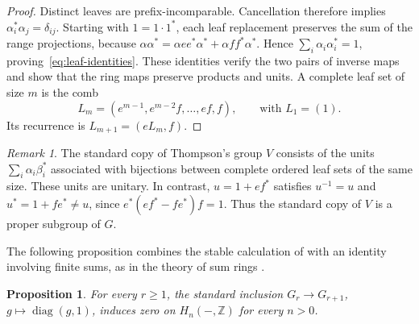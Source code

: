 \documentclass[11pt]{amsart}
\newcommand{\Z}{\mathbb Z}
\newtheorem{proposition}[theorem]{Proposition}
\theoremstyle{definition}
\theoremstyle{remark}
\newtheorem{remark}[theorem]{Remark}
\numberwithin{equation}{section}
\begin{document}
\begin{proof}
Distinct leaves are prefix-incomparable. Cancellation therefore implies $\alpha_i^*\alpha_j=\delta_{ij}$. Starting with $1=1\cdot1^*$, each leaf replacement preserves the sum of the range projections, because $\alpha\alpha^*=\alpha ee^*\alpha^*+\alpha ff^*\alpha^*$. Hence $\sum_i\alpha_i\alpha_i^*=1$, proving~\eqref{eq:leaf-identities}. These identities verify the two pairs of inverse maps and show that the ring maps preserve products and units. A complete leaf set of size $m$ is the comb
$$
L_m=(e^{m-1},e^{m-2}f,\ldots,ef,f),\qquad\text{with }L_1=(1).
$$
Its recurrence is $L_{m+1}=(eL_m,f)$.
\end{proof}

\begin{remark}\label{rem:proper-standard-V}
The standard copy of Thompson's group $V$ consists of the units $\sum_i\alpha_i\beta_i^*$ associated with bijections between complete ordered leaf sets of the same size. These units are unitary. In contrast, $u=1+ef^*$ satisfies $u^{-1}=u$ and $u^*=1+fe^*\ne u$, since $e^*(ef^*-fe^*)f=1$. Thus the standard copy of $V$ is a proper subgroup of $G$.
\end{remark}

The following proposition combines the stable calculation of \cite{ABC09} with an identity involving finite sums, as in the theory of sum rings \cite[\S2]{Wagoner72}.

\begin{proposition}\label{prop:zero-padding}
For every $r\geq1$, the standard inclusion $G_r\to G_{r+1}$, $g\mapsto\operatorname{diag}(g,1)$, induces zero on $H_n(-,\Z)$ for every $n>0$.
\end{proposition}
\end{document}
